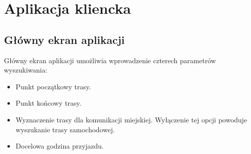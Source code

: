 \documentclass[a4paper,12pt]{article}
\begin{document}
	\section*{Aplikacja kliencka}

	\subsection*{Główny ekran aplikacji}

	Główny ekran aplikacji umożliwia wprowadzenie czterech parametrów wyszukiwania:

	\begin{itemize}
		\item Punkt początkowy trasy.
		\item Punkt końcowy trasy.
		\item Wyznaczenie trasy dla komunikacji miejskiej. Wyłączenie tej opcji powoduje wyszukanie trasy samochodowej.
		\item Docelowa godzina przyjazdu.
	\end{itemize} 
\end{document}
